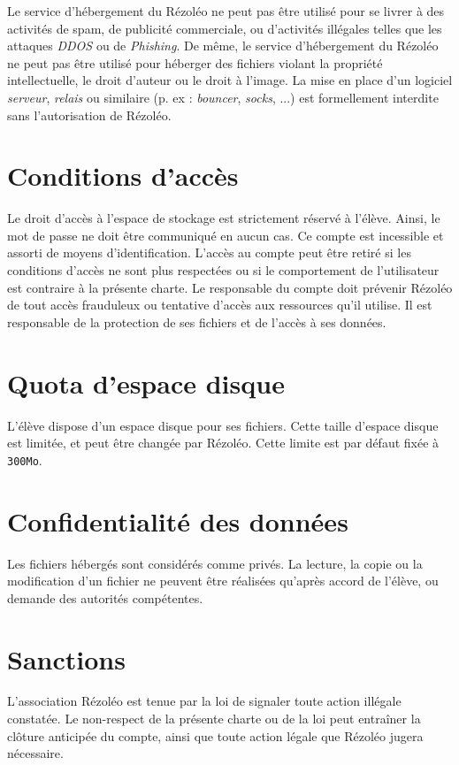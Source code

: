 \documentclass[12pt, a4paper]{article}
\begin{document}
Le service d'hébergement du Rézoléo ne peut pas être utilisé pour se livrer à des activités de spam, de publicité commerciale, ou d'activités illégales telles que les attaques \textit{DDOS} ou de \textit{Phishing}. De même, le service d'hébergement du Rézoléo ne peut pas être utilisé pour héberger des fichiers violant la propriété intellectuelle, le droit d'auteur ou le droit à l'image. La mise en place d'un logiciel \textit{serveur}, \textit{relais} ou similaire (p. ex : \textit{bouncer}, \textit{socks}, ...) est formellement interdite sans l'autorisation de Rézoléo.

\section{Conditions d'accès}
Le droit d'accès à l'espace de stockage est strictement réservé à l'élève. Ainsi, le mot de passe ne doit être communiqué en aucun cas. Ce compte est incessible et assorti de moyens d'identification. L'accès au compte peut être retiré si les conditions d'accès ne sont plus respectées ou si le comportement de l'utilisateur est contraire à la présente charte. Le responsable du compte doit prévenir Rézoléo de tout accès frauduleux ou tentative d'accès aux ressources qu'il utilise. Il est responsable de la protection de ses fichiers et de l'accès à ses données.

\section{Quota d'espace disque}
L'élève dispose d'un espace disque pour ses fichiers. Cette taille d'espace disque est limitée, et peut être changée par Rézoléo. Cette limite est par défaut fixée à \texttt{300Mo}.

\section{Confidentialité des données}
Les fichiers hébergés sont considérés comme privés. La lecture, la copie ou la modification d'un fichier ne peuvent être réalisées qu'après accord de l'élève, ou demande des autorités compétentes.

\section{Sanctions}
L'association Rézoléo est tenue par la loi de signaler toute action illégale constatée. Le non-respect de la présente charte ou de la loi peut entraîner la clôture anticipée du compte, ainsi que toute action légale que Rézoléo jugera nécessaire.
\end{document}
